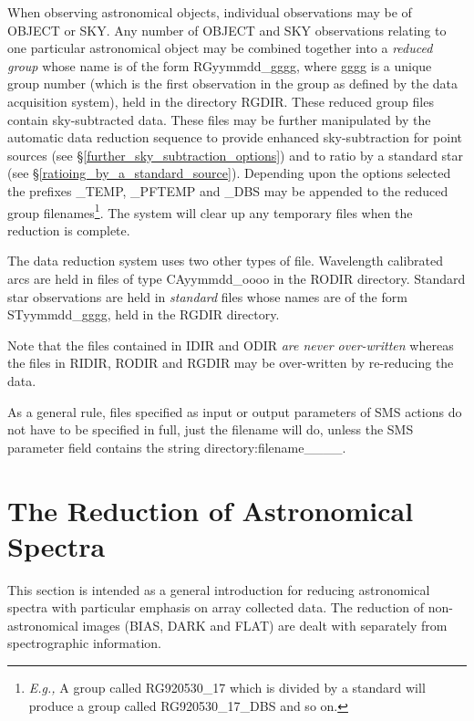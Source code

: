 {When observing astronomical objects, individual observations may be of 
{\sf OBJECT} or {\sf SKY}. Any number of {\sf OBJECT} and {\sf SKY} 
observations relating to one particular astronomical object may be 
combined together into a {\em reduced group} whose name is of the 
form {\sf RGyymmdd\_gggg}, where {\sf gggg} is a unique group number
(which is the first observation in the group as defined by the data 
acquisition system), held in the directory {\sf RGDIR}. These reduced group 
files contain sky-subtracted data. These files may be further manipulated by
the automatic data reduction sequence to provide enhanced sky-subtraction
for point sources (see \S \ref{further_sky_subtraction_options}) and to
ratio by a standard star (see \S \ref{ratioing_by_a_standard_source}). 
Depending upon the options selected the prefixes {\sf \_TEMP}, {\sf \_PFTEMP}
and {\sf \_DBS} may be appended to the reduced group filenames\footnote{{\em 
E.g.,} A group called {\sf RG920530\_17} which is divided by
a standard will produce a group called {\sf RG920530\_17\_DBS} and so on.}. 
The system will clear up any temporary files when the reduction is complete.

The data reduction system uses two other types of file.
Wavelength calibrated arcs are held in files 
of type {\sf CAyymmdd\_oooo} in the {\sf RODIR} directory.
Standard star observations are held in {\em standard} files whose names
are of the form {\sf STyymmdd\_gggg}, held in the {\sf RGDIR} directory.

Note that the files contained in IDIR and ODIR {\em are never over-written}
whereas the files in RIDIR, RODIR and RGDIR may be over-written by re-reducing
the data. 

As a general rule, files specified as input or output parameters of SMS actions
do not have to be specified in full, just the filename will do, unless
the SMS parameter field contains the string 
{\sf directory:filename\_\_\_\_}.

\newpage
\markright{\stardocname}
\section{The Reduction of Astronomical Spectra}
\label{the_reduction_of_astronomical_spectra}

This section is intended as a general introduction for reducing astronomical
spectra with particular emphasis on array collected data. The reduction
of non-astronomical images ({\sf BIAS}, {\sf DARK} and {\sf FLAT}) are dealt 
with separately from spectrographic information.

}

